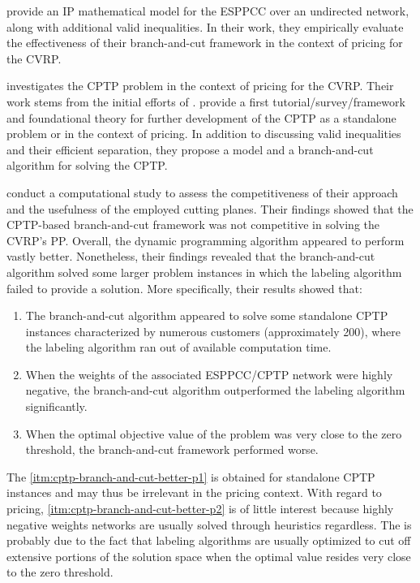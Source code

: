 \medskip

\textcite{jepsen2008branchandcut} provide an IP mathematical model
for the ESPPCC over an undirected network, along with additional valid inequalities.
In their work, they empirically evaluate the effectiveness of their
branch-and-cut framework in the context of pricing for the CVRP.

\textcite{jepsen2014} investigates the CPTP problem in the context of pricing for the CVRP.
Their work stems from the initial efforts of \textcite{jepsen2008branchandcut}.
\citeauthor{jepsen2014} provide a first tutorial/survey/framework and foundational theory
for further development of the CPTP as a standalone problem or in the context of pricing.
In addition to discussing valid inequalities and their efficient separation,
they propose a model and a branch-and-cut algorithm for solving the CPTP.

\textcite{jepsen2014} conduct a computational study
to assess the competitiveness of their approach
and the usefulness of the employed cutting planes.
Their findings showed that the CPTP-based branch-and-cut framework
was not competitive in solving the CVRP's PP.
Overall, the dynamic programming algorithm appeared to perform vastly better.
Nonetheless, their findings revealed that the branch-and-cut algorithm
solved some larger problem instances in which the labeling algorithm failed to provide a solution.
More specifically, their results showed that:
\begin{enumerate}
	\setlength{\itemsep}{0pt}
	\setlength{\parskip}{0pt}

	\item \label{itm:cptp-branch-and-cut-better-p1} The branch-and-cut algorithm
	      appeared to solve some standalone CPTP instances characterized
	      by numerous customers (approximately 200),
	      where the labeling algorithm ran out of available computation time.
	\item \label{itm:cptp-branch-and-cut-better-p2} When the weights of the associated
	      ESPPCC/CPTP network were highly negative,
	      the branch-and-cut algorithm outperformed the labeling algorithm significantly.
	\item \label{itm:cptp-branch-and-cut-better-p3} When the optimal objective value
	      of the problem was very close to the zero threshold,
	      the branch-and-cut framework performed worse.
\end{enumerate}
The \cref{itm:cptp-branch-and-cut-better-p1} is obtained for standalone CPTP instances
and may thus be irrelevant in the pricing context.
With regard to pricing, \cref{itm:cptp-branch-and-cut-better-p2} is of little interest
because highly negative weights networks are usually solved through heuristics regardless.
The  is probably due to the fact
that labeling algorithms are usually optimized to cut off extensive portions of the solution space
when the optimal value resides very close to the zero threshold.

